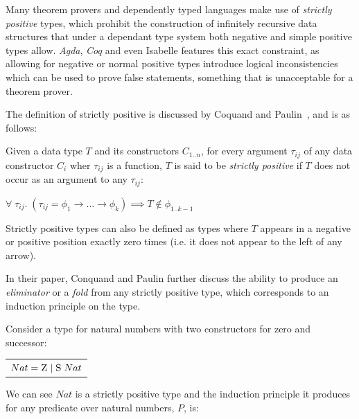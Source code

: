 Many theorem provers and dependently typed languages make use of \textit{strictly positive} types, which
prohibit the construction of infinitely recursive data structures that under a dependant type system
both negative and simple positive types allow.
\textit{Agda}\citep{AgdaStrictlyPositive}, \textit{Coq}\citep{CoqStrictlyPositive} and even
Isabelle\citep{IsabelleStrictlyPositive} features this exact constraint, as allowing for negative
or normal positive types introduce logical inconsistencies which can be used to prove false statements,
something that is unacceptable for a theorem prover.

The definition of strictly positive is discussed by Coquand and Paulin~\cite{CoquandTypes}, and is as follows:

\theoremstyle{definition}
\begin{definition}
    \label{def:sp}
    Given a data type $T$ and its constructors $C_{1..n}$, for every argument $\tau_{ij}$
    of any data constructor $C_i$ wher $\tau_{ij}$ is a function, $T$ is said to be \textit{strictly positive} if 
    $T$ does not occur as an argument to any $\tau_{ij}$:

    \begin{center}
        $\forall\; \tau_{ij}.\;
        (\tau_{ij} = \phi_{1} \rightarrow \dots \rightarrow \phi_{k})
        \implies T \notin \phi_{1..k-1}$
    \end{center}
\end{definition}

Strictly positive types can also be defined as types where $T$ appears in a negative or positive 
position exactly zero times (i.e. it does not appear to the left of any arrow).

In their paper, Conquand and Paulin further discuss the ability to produce an \textit{eliminator} or a
\textit{fold} from any strictly positive type, which corresponds to an induction principle on the type.

Consider a type for natural numbers with two constructors for zero and successor:

\begin{center}
    \begin{tabular}{l}
        $Nat = \textsc{Z}\; \vert\; \textsc{S}\; Nat$ \\
    \end{tabular} 
\end{center}

We can see $Nat$ is a strictly positive type and the induction principle it produces
for any predicate over natural numbers, $P$, is:


